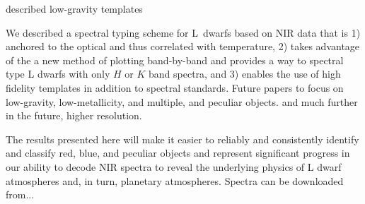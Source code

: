 \documentclass[12pt,preprint]{aastex}
\begin{document}
described low-gravity templates



We described a spectral typing scheme for L~dwarfs based on NIR data that is 1) anchored to the optical and thus correlated with temperature, 2) takes advantage of the a new method of plotting band-by-band and provides a way to spectral type L dwarfs with only $H$ or $K$ band spectra, and 3) enables the use of high fidelity templates in addition to spectral standards.
Future papers to focus on low-gravity, low-metallicity, and multiple, and peculiar objects. and much further in the future, higher resolution.

The results presented here will make it easier to reliably and consistently identify and classify red, blue, and peculiar objects and represent significant progress in our ability to decode NIR spectra to reveal the underlying physics of L dwarf atmospheres and, in turn, planetary atmospheres.
Spectra can be downloaded from...
\end{document}
